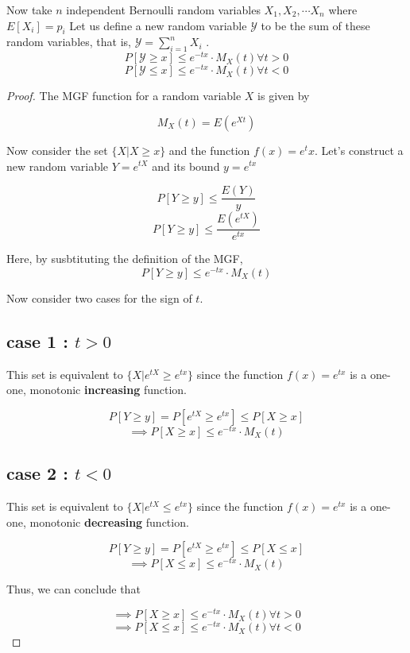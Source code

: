 \documentclass[openany]{book}
\begin{document}
    \begin{lemma}
        Now take $n$ independent Bernoulli random variables $X_1, X_2, \cdots X_n$ where $E[X_i] = p_i$
        Let us define a new random variable $\mathcal{Y}$ to be the sum of these random variables, that is, $\mathcal{Y} = \sum_{i=1}^{n} X_i$ .
        \[  P[\mathcal{Y} \geq x] \leq e^{-tx} \cdot M_X(t) \forall t > 0 \]
	    \[  P[\mathcal{Y} \leq x] \leq e^{-tx} \cdot M_X(t) \forall t < 0 \]
	
    \end{lemma}

    \begin{proof}
        The MGF function for a random variable $X$ is given by
	
        \[ M_X(t) = E(e^{Xt}) \]
        
        Now consider the set $\{X | X \geq x\}$ and the function $f(x) = e ^tx$. Let's construct a new random variable $Y = e^{tX}$ and its 
        bound $y=e^{tx}$ 
        
        \[ P[Y \geq y] \leq \frac{E(Y)}{y} \]
        \[ P[Y \geq y] \leq \frac{E(e^{tX})}{e^{tx}} \]
        
        Here, by susbtituting the definition of the MGF, 
        \[ P[Y \geq y] \leq e^{-tx} \cdot M_X(t) \]
        
        Now consider two cases for the sign of $t$.
        
        \subsection*{case 1 : $t>0$}
        
        This set is equivalent to $\{X | e^{tX} \geq e^{tx} \}$  since the function $f(x) = e ^{tx}$ is a one-one, monotonic \textbf{increasing} function.
        
        \[ P[Y \geq y] = P[e^{tX} \geq e^{tx}] \leq P[X \geq x] \]
        \[ \implies P[X \geq x] \leq e^{-tx} \cdot M_X(t) \]
        
        \subsection*{case 2 : $t<0$} 
        
        This set is equivalent to $\{X | e^{tX} \leq e^{tx} \}$  since the function $f(x) = e ^{tx}$ is a one-one, monotonic \textbf{decreasing} function.
        
        \[ P[Y \geq y] = P[e^{tX} \geq e^{tx}] \leq P[X \leq x] \]
        \[ \implies P[X \leq x] \leq e^{-tx} \cdot M_X(t) \]
        
        Thus, we can conclude that 
        
        \[ \implies P[X \geq x] \leq e^{-tx} \cdot M_X(t) \forall t > 0 \]
        \[ \implies P[X \leq x] \leq e^{-tx} \cdot M_X(t) \forall t < 0 \]
        
    \end{proof}
\end{document}
